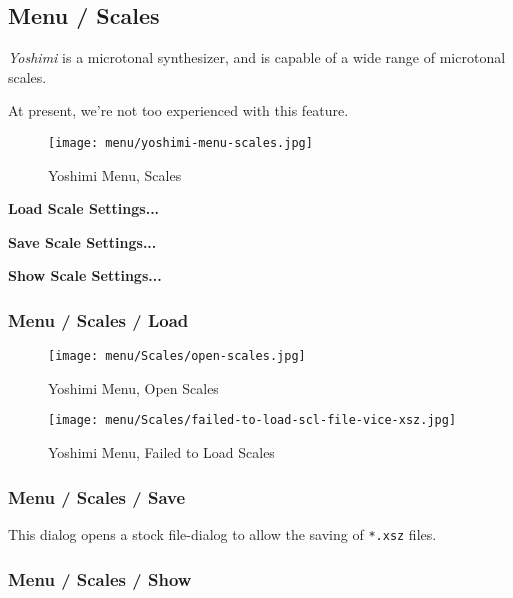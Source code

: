 \subsection{Menu / Scales}
\label{subsec:menu_scales}

   \textsl{Yoshimi} is a microtonal synthesizer, and is capable of a wide
   range of microtonal scales.

   At present, we're not too experienced with this feature.

\begin{figure}[H]
   \centering 
   \texttt{[image: menu/yoshimi-menu-scales.jpg]}
   \caption{Yoshimi Menu, Scales}
   \label{fig:yoshimi_menu_scales}
\end{figure}

   \begin{enumber}
      \item \textbf{Load Scale Settings...}
      \item \textbf{Save Scale Settings...}
      \item \textbf{Show Scale Settings...}
   \end{enumber}

\subsubsection{Menu / Scales / Load}
\label{subsec:menu_scales_load}

\begin{figure}[H]
   \centering 
   \texttt{[image: menu/Scales/open-scales.jpg]}
   \caption{Yoshimi Menu, Open Scales}
   \label{fig:yoshimi_menu_open_scales}
\end{figure}

\begin{figure}[H]
   \centering 
   \texttt{[image: menu/Scales/failed-to-load-scl-file-vice-xsz.jpg]}
   \caption{Yoshimi Menu, Failed to Load Scales}
   \label{fig:yoshimi_menu_failed_to_load_scales}
\end{figure}

\subsubsection{Menu / Scales / Save}
\label{subsec:menu_scales_save}

   This dialog opens a stock file-dialog to allow the saving of
   \texttt{*.xsz} files.

\subsubsection{Menu / Scales / Show}
\label{subsec:menu_scales_show}

